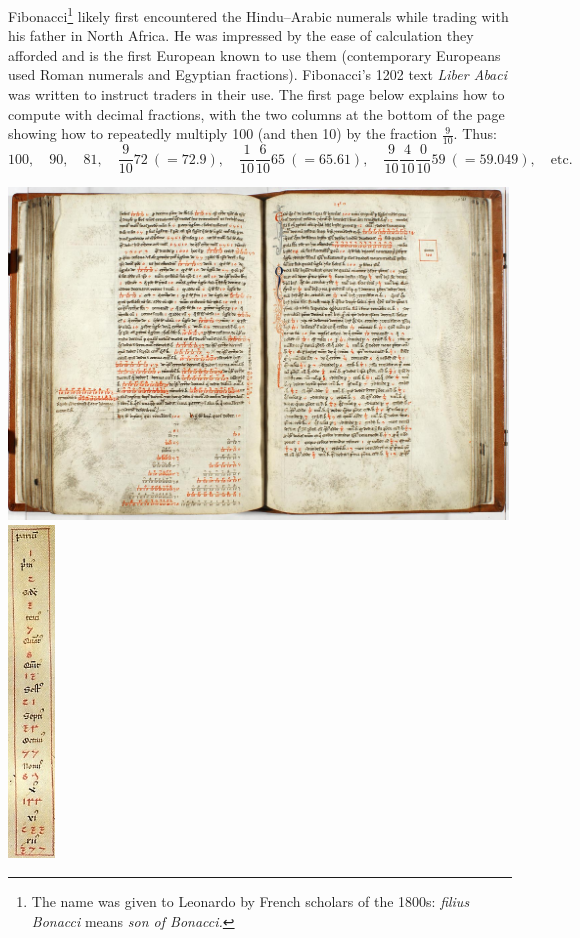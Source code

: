 Fibonacci\footnote{The name was given to Leonardo by French scholars of the 1800s: \emph{filius Bonacci} means \emph{son of Bonacci.}} likely first encountered the Hindu--Arabic numerals while trading with his father in North Africa. He was impressed by the ease of calculation they afforded and is the first European known to use them (contemporary Europeans used Roman numerals and Egyptian fractions). Fibonacci's 1202 text \emph{Liber Abaci} was written to instruct traders in their use. The first page below explains how to compute with decimal fractions, with the two columns at the bottom of the page showing how to repeatedly multiply 100 (and then 10) by the fraction $\frac 9{10}$. Thus:
\[
	100,\quad 90,\quad 81,\quad \frac 9{10}72\ (=72.9),\quad \frac 1{10}\!\frac 6{10}65\ (=65.61),\quad\frac 9{10}\!\frac 4{10}\!\frac 0{10}59\ (=59.049),\quad\text{etc.}
\]
\begin{center}
	\includegraphics[height=250pt]{liberabaci3}
	\quad
	\includegraphics[height=250pt]{liberabaci1}
\end{center}
